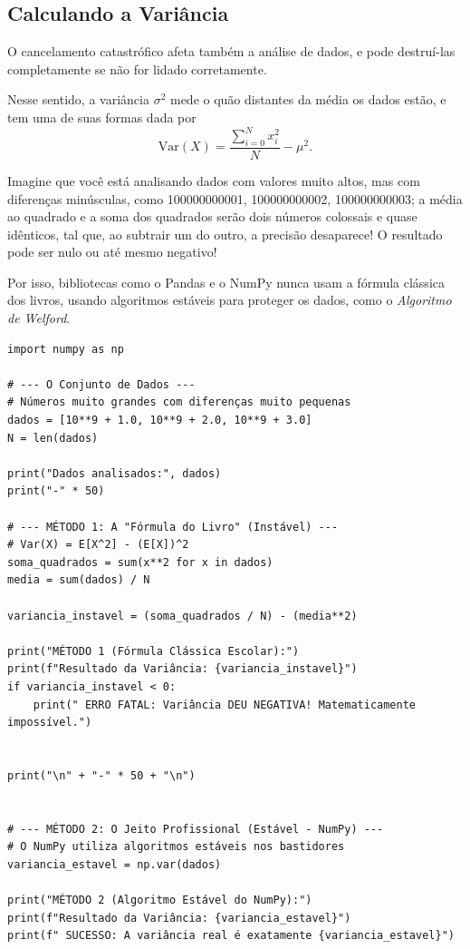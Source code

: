 \documentclass[../numerical_methods.tex]{subfiles}
\begin{document}
\subsection{Calculando a Variância}
O cancelamento catastrófico afeta também a análise de dados, e pode destruí-las completamente se não for lidado corretamente.

Nesse sentido, a variância \(\sigma^{2}\) mede o quão distantes da média os dados estão, e tem uma de suas formas dada por
\[
	\mathrm{Var}(X) = \frac{\sum\limits_{i=0}^{N}x_{i}^{2}}{N} - \mu^{2}.
\]

Imagine que você está analisando dados com valores muito altos, mas com diferenças minúsculas, como 100000000001, 100000000002, 100000000003; a média ao quadrado e a soma dos quadrados serão dois números colossais e quase idênticos, tal que, ao subtrair um do outro, a precisão desaparece! O resultado pode ser nulo ou até mesmo negativo!

Por isso, bibliotecas como o Pandas e o NumPy nunca usam a fórmula clássica dos livros, usando algoritmos estáveis para proteger os dados, como o \textit{Algoritmo de Welford}.

\begin{listing}[H]
	\caption{Calculando a Variância}
	\begin{verbatim}
import numpy as np

# --- O Conjunto de Dados ---
# Números muito grandes com diferenças muito pequenas
dados = [10**9 + 1.0, 10**9 + 2.0, 10**9 + 3.0]
N = len(dados)

print("Dados analisados:", dados)
print("-" * 50)

# --- MÉTODO 1: A "Fórmula do Livro" (Instável) ---
# Var(X) = E[X^2] - (E[X])^2
soma_quadrados = sum(x**2 for x in dados)
media = sum(dados) / N

variancia_instavel = (soma_quadrados / N) - (media**2)

print("MÉTODO 1 (Fórmula Clássica Escolar):")
print(f"Resultado da Variância: {variancia_instavel}")
if variancia_instavel < 0:
    print(" ERRO FATAL: Variância DEU NEGATIVA! Matematicamente impossível.")


print("\n" + "-" * 50 + "\n")


# --- MÉTODO 2: O Jeito Profissional (Estável - NumPy) ---
# O NumPy utiliza algoritmos estáveis nos bastidores
variancia_estavel = np.var(dados)

print("MÉTODO 2 (Algoritmo Estável do NumPy):")
print(f"Resultado da Variância: {variancia_estavel}")
print(f" SUCESSO: A variância real é exatamente {variancia_estavel}")
\end{verbatim}
\end{listing}
\end{document}
